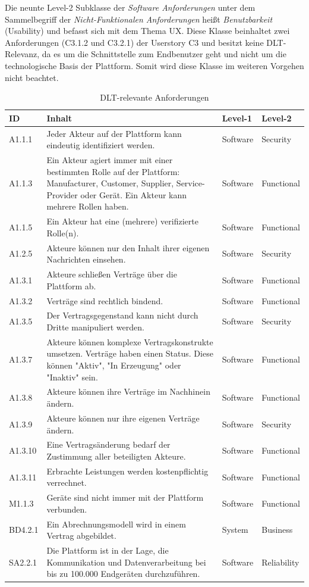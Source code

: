 Die neunte Level-2 Subklasse der \textit{Software Anforderungen} unter dem Sammelbegriff der \textit{Nicht-Funktionalen Anforderungen} heißt \textit{Benutzbarkeit} (Usability) und befasst sich mit dem Thema \ac{UX}. Diese Klasse beinhaltet zwei Anforderungen (C3.1.2 und C3.2.1) der Userstory C3 und besitzt keine \ac{DLT}-Relevanz, da es um die Schnittstelle zum Endbenutzer geht und nicht um die technologische Basis der Plattform. Somit wird diese Klasse im weiteren Vorgehen nicht beachtet.\\


\begin{table}[]
\begin{tabu} to \textwidth {XX[3]XX}
\toprule
\textbf{ID} & \textbf{Inhalt} & \textbf{Level-1} & \textbf{Level-2} \\ \midrule
A1.1.1 & Jeder Akteur auf der Plattform kann eindeutig identifiziert werden. & Software & Security \\
A1.1.3 & Ein Akteur agiert immer mit einer bestimmten Rolle auf der Plattform: Manufacturer, Customer, Supplier, Service-Provider oder Gerät. Ein Akteur kann mehrere Rollen haben. & Software & Functional \\
A1.1.5 & Ein Akteur hat eine (mehrere) verifizierte Rolle(n). & Software & Functional \\
A1.2.5 & Akteure können nur den Inhalt ihrer eigenen Nachrichten einsehen. & Software & Security \\
A1.3.1 & Akteure schließen Verträge über die Plattform ab. & Software & Functional \\
A1.3.2 & Verträge sind rechtlich bindend. & Software & Functional \\
A1.3.5 & Der Vertragsgegenstand kann nicht durch Dritte manipuliert werden. & Software & Security \\
A1.3.7 & Akteure können komplexe Vertragskonstrukte umsetzen. Verträge haben einen Status. Diese können "Aktiv", "In Erzeugung" oder "Inaktiv" sein. & Software & Functional \\
A1.3.8 & Akteure können ihre Verträge im Nachhinein ändern. & Software & Functional \\
A1.3.9 & Akteure können nur ihre eigenen Verträge ändern. & Software & Security \\
A1.3.10 & Eine Vertragsänderung bedarf der Zustimmung aller beteiligten Akteure. & Software & Functional \\
A1.3.11 & Erbrachte Leistungen werden kostenpflichtig verrechnet. & Software & Functional \\
M1.1.3 & Geräte sind nicht immer mit der Plattform verbunden. & Software & Functional \\
BD4.2.1 & Ein Abrechnungsmodell wird in einem Vertrag abgebildet. & System & Business \\
SA2.2.1 & Die Plattform ist in der Lage, die Kommunikation und Datenverarbeitung bei bis zu 100.000 Endgeräten durchzuführen. & Software & Reliability \\ \bottomrule
\end{tabu}
\caption{DLT-relevante Anforderungen}
\label{tab:dlt_relevant}
\end{table}
